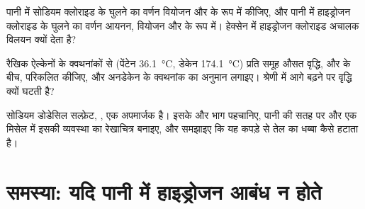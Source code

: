 \begin{exercise}[$\star\star\star$]\label{exo:b1:intermolecular-forces-solvents:10}
पानी में सोडियम क्लोराइड के घुलने का वर्णन वियोजन और  के रूप में
कीजिए, और पानी में हाइड्रोजन क्लोराइड के घुलने का वर्णन आयनन, वियोजन और
 के रूप में। हेक्सेन में हाइड्रोजन क्लोराइड अचालक विलयन
क्यों देता है?
\end{exercise}

\begin{exercise}[$\star\star\star$]\label{exo:b1:intermolecular-forces-solvents:11}
रैखिक ऐल्केनों के क्वथनांकों से (पेंटेन
\qty{36.1}{\celsius}, डेकेन \qty{174.1}{\celsius}) प्रति  समूह औसत वृद्धि,
 और  के बीच, परिकलित कीजिए, और अनडेकेन के
क्वथनांक का अनुमान लगाइए। श्रेणी में आगे बढ़ने पर वृद्धि क्यों घटती है?
\end{exercise}

\begin{exercise}[$\star\star\star$]\label{exo:b1:intermolecular-forces-solvents:12}
सोडियम डोडेसिल सल्फ़ेट, , एक अपमार्जक है। इसके
 और  भाग पहचानिए, पानी की सतह पर और एक मिसेल में इसकी
व्यवस्था का रेखाचित्र बनाइए, और समझाइए कि यह कपड़े से तेल का
धब्बा कैसे हटाता है।
\end{exercise}

\section{समस्या: यदि पानी में हाइड्रोजन आबंध न होते}

